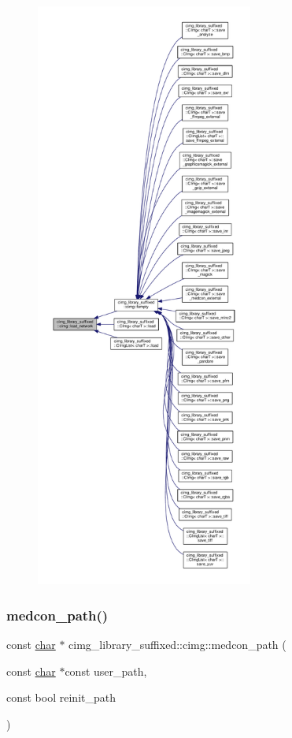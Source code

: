 \begin{figure}[H]
\begin{center}
\leavevmode
\includegraphics[height=550pt]{d4/d9b/namespacecimg__library__suffixed_1_1cimg_a90c05fe6fc049cba75f3a12807e97158_icgraph}
\end{center}
\end{figure}
\mbox{\label{namespacecimg__library__suffixed_1_1cimg_a65c2f6f9671ac4f3eae2b5624313926e}} 
\subsubsection{\texorpdfstring{medcon\+\_\+path()}{medcon\_path()}}
{\footnotesize\ttfamily const \hyperlink{classchar}{char} $\ast$ cimg\+\_\+library\+\_\+suffixed\+::cimg\+::medcon\+\_\+path (\begin{DoxyParamCaption}\item[{const \hyperlink{classchar}{char} $\ast$const}]{user\+\_\+path,  }\item[{const bool}]{reinit\+\_\+path }\end{DoxyParamCaption})\hspace{0.3cm}{\ttfamily [inline]}}




